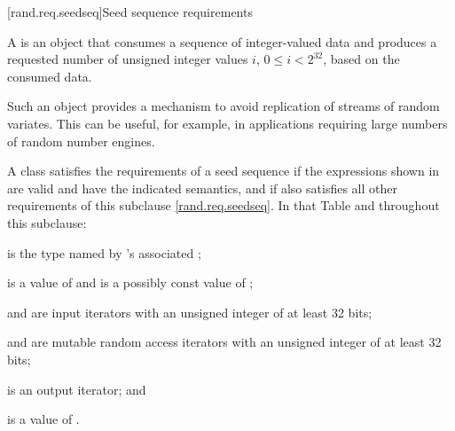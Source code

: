 
[rand.req.seedseq]{Seed sequence requirements}%
%

\pnum
 A 
 is an object
 that consumes a sequence
 of integer-valued data
 and produces a requested number
 of unsigned integer values $i$, $0 \le i < 2^{32}$,
 based on the consumed data.
\begin{note}
 Such an object provides a mechanism
 to avoid replication of streams of random variates.
 This can be useful, for example, in applications
 requiring large numbers of random number engines.
\end{note}

\pnum
A class 
satisfies the requirements
of a seed sequence
if the expressions shown
in 
are valid and have the indicated semantics,
and if  also satisfies all other requirements
of this subclause \ref{rand.req.seedseq}.
In that Table and throughout this subclause:
\begin{enumeratea}
  \item
     is the type named by
    's associated ;
  \item
     is a value of 
    and
     is a possibly const value of ;
  \item
     and  are input iterators
    with an unsigned integer  of at least 32 bits;
  \item
     and  are mutable random access iterators
    with an unsigned integer  of at least 32 bits;
  \item
     is an output iterator;
  and
  \item
     is a value of .
\end{enumeratea}


